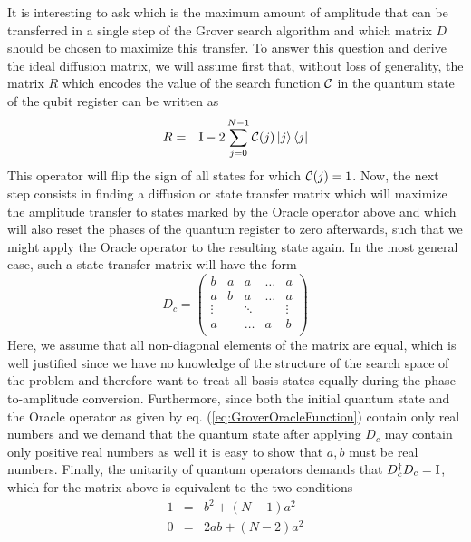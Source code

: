 It is interesting to ask which is the maximum amount of amplitude that can be transferred in a single step of the Grover search algorithm and which matrix $D$ should be chosen to maximize this transfer. To answer this question and derive the ideal diffusion matrix, we will assume first that, without loss of generality, the matrix $R$ which encodes the value of the search function $\Or$ in the quantum state of the qubit register can be written as
%
\begin{eqnarray}
R & = & \begin{mathrm}I\end{mathrm}-2\sum\limits_{j=0}^{N-1} \Or(j)\ket{j}\bra{j} \label{eq:GroverOracleFunction}
\end{eqnarray}
%
This operator will flip the sign of all states for which $\Or(j) = 1$. Now, the next step consists in finding a diffusion or state transfer matrix which will maximize the amplitude transfer to states marked by the Oracle operator above and which will also reset the phases of the quantum register to zero afterwards, such that we might apply the Oracle operator to the resulting state again. In the most general case, such a state transfer matrix will have the form
%
\begin{equation}
D_c = \left(	
	\begin{array}{ccccc}
		b & a & a & \hdots & a \\
		a & b & a & \hdots & a \\
		\vdots & & \ddots &  &\vdots \\
		a & & \hdots & a & b \\
	\end{array}
\right)
\end{equation}
%
Here, we assume that all non-diagonal elements of the matrix are equal, which is well justified since we have no knowledge of the structure of the search space of the problem and therefore want to treat all basis states equally during the phase-to-amplitude conversion. Furthermore, since both the initial quantum state and the Oracle operator as given by eq. (\ref{eq:GroverOracleFunction}) contain only real numbers and we demand that the quantum state after applying $D_c$ may contain only positive real numbers as well it is easy to show that $a,b$ must be real numbers. Finally, the unitarity of quantum operators demands that $D_c^\dagger D_c = \begin{mathrm}I\end{mathrm}$, which for the matrix above is equivalent to the two conditions
%
\begin{eqnarray}
 1 & = & b^2+(N-1)a^2 \\
0 & = & 2ab +(N-2)a^2
\end{eqnarray}
